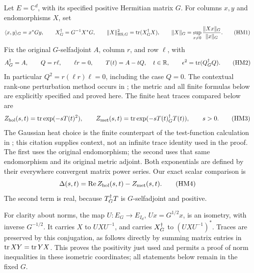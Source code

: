Let \(E=\mathbb C^d\), with its specified positive Hermitian matrix \(G\).
For columns \(x,y\) and endomorphisms \(X\), set
\begin{equation}
 \langle x,y\rangle_G=x^*Gy,\qquad
 X^\dagger_G=G^{-1}X^*G,\qquad
 \|X\|_{\mathrm{HS},G}^2=\operatorname{tr}(X^\dagger_G X),\qquad
 \|X\|_G=\sup_{x\ne0}\frac{\|Xx\|_G}{\|x\|_G}.
 \tag{HM1}\label{nhm:HM1}
\end{equation}
Fix the original \(G\)-selfadjoint \(A\), column \(r\), and row \(\ell\), with
\begin{equation}
 A^\dagger_G=A,\qquad Q=r\ell,\qquad \ell r=0,\qquad
 T(t)=A-tQ,\quad t\in\mathbb R,\qquad
 \epsilon^2=\operatorname{tr}(Q^\dagger_G Q).
 \tag{HM2}\label{nhm:HM2}
\end{equation}
In particular \(Q^2=r(\ell r)\ell=0\), including the case \(Q=0\).
The contextual rank-one perturbation method occurs in
\cite[original-source Section \texttt{sect:sa}]{nhm:ConnesSuijlekom};
the metric and all finite formulas below are explicitly specified and proved here.
The finite heat traces compared below are
\begin{equation}
 Z_{\mathrm{hol}}(s,t)=\operatorname{tr}\exp(-sT(t)^2),\qquad
 Z_{\mathrm{met}}(s,t)=\operatorname{tr}\exp(-sT(t)^\dagger_G T(t)),\qquad s>0.
 \tag{HM3}\label{nhm:HM3}
\end{equation}
The Gaussian heat choice is the finite counterpart of the test-function
calculation in \cite[original-source formula \texttt{ft}]{nhm:ConnesHeat};
this citation supplies context, not an infinite trace identity used in the proof.
The first uses the original endomorphism; the second uses that same
endomorphism and its original metric adjoint. Both exponentials are defined
by their everywhere convergent matrix power series. Our exact scalar comparison is
\begin{equation}
 \Delta(s,t)=\operatorname{Re} Z_{\mathrm{hol}}(s,t)-Z_{\mathrm{met}}(s,t).
 \tag{HM4}\label{nhm:HM4}
\end{equation}
The second term is real, because \(T^\dagger_G T\) is \(G\)-selfadjoint and positive.

For clarity about norms, the map \(U:E_G\longrightarrow E_{I_d}\),
\(Ux=G^{1/2}x\), is an isometry, with inverse \(G^{-1/2}\).
It carries \(X\) to \(UXU^{-1}\), and carries \(X^\dagger_G\) to
\((UXU^{-1})^*\). Traces are preserved by this conjugation, as follows
directly by summing matrix entries in \(\operatorname{tr} XY=\operatorname{tr} YX\).
This proves the positivity just used and permits a proof of norm inequalities
in these isometric coordinates; all statements below remain in the fixed \(G\).

